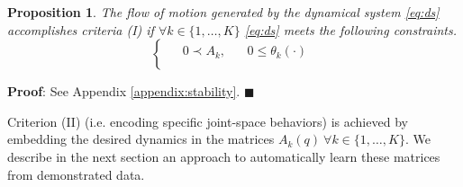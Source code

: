 \documentclass[letterpaper, 10 pt, conference,fleqn]{ieeeconf}
\begin{document}
\newtheorem{prop1}{Proposition}
\begin{prop1}
\label{prop:stability}
The flow of motion generated by the dynamical system \eqref{eq:ds} accomplishes criteria (I) if $ \forall k \in \{1,\dots,K\}  $ \eqref{eq:ds} meets the following constraints. 
\begin{equation}
\label{eq:first_criteria_stability}
\begin{cases}
\begin{split}
 & 0 \prec A_k, & ~~~~ 0 \leq \theta_k(\cdot) \\
\end{split}
\end{cases}
\end{equation}    
\end{prop1}
\vspace{5pt}
\textbf{Proof}: See Appendix \ref{appendix:stability}. $\blacksquare$

Criterion (II) (i.e. encoding specific joint-space behaviors) is achieved by embedding the desired dynamics in the matrices $A_k(q)~ \forall k \in\{1,\dots,K\}$. We describe in the next section an approach to automatically learn these matrices from demonstrated data. 

\end{document}
